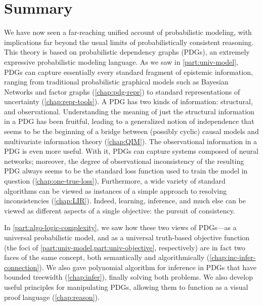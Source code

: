 
\section{Summary}

We have now seen a far-reaching unified account of probabilistic modeling,
    with implications far beyond the usual limits of probabilistically consistent reasoning. 
%
This theory is based on probabilistic dependency graphs (PDGs), an extremely expressive probabilistic modeling language.
As we saw in \cref{part:univ-model}, PDGs can capture essentially every standard fragment of epistemic information, ranging from traditional probabilistic graphical models such as Bayesian Networks and factor graphs (\cref{chap:pdg-repr}) to standard representations of uncertainty (\cref{chap:repr-tools}).
A PDG has two kinds of information: structural, and observational.
Understanding the meaning of just the structural information in a PDG has been fruitful, leading to a generalized notion of independence that seems to be the beginning of a bridge between (possibly cyclic) causal models and multivariate information theory (\cref{chap:QIM}). 
%
The observational information in a PDG is even more useful. 
With it, PDGs can capture systems composed of neural networks; moreover, 
    the degree of observational inconsistency of the resulting PDG always seems to be the standard loss function used to train the model in question (\cref{chap:one-true-loss}),
Furthermore, a wide variety of standard algorithms can be viewed as instances of a simple approach to resolving inconsistencies (\cref{chap:LIR}).
Indeed, learning, inference, and 
    much else can be viewed as different aspects of a single objective: the pursuit of consistency. 

In \cref{part:algo-logic-complexity}, we saw how these two views of PDGs---as a universal probabilistic model, and as a universal truth-based objective function (the foci of \cref{part:univ-model,part:univ-objective}, respectively) are in fact two faces of the same concept, both semantically and algorithmically (\cref{chap:inc-infer-connection}). 
We also gave polynomial algorithm for inference in PDGs that have bounded treewidth (\cref{chap:infer}), finally solving both problems. 
We also develop useful principles for manipulating PDGs, 
    allowing them to function as a visual proof language (\cref{chap:reason}).


